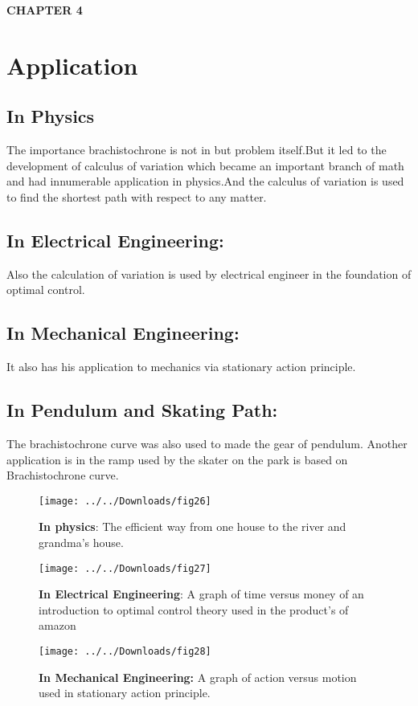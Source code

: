 \documentclass[10pt,a4paper]{article}
\begin{document}
\newpage
\begin{center}
   \textbf{ \textbf{CHAPTER 4}}
    \vspace{1.5 cm}
    \section{Application}
     \vspace{1.5 cm}
    \subsection{In Physics}
    The importance brachistochrone is not in but problem itself.But it led to the
    development of calculus of variation which became an important branch of math and
    had innumerable application in physics.And the calculus of variation is used to find the shortest path with respect to any matter.
    \subsection{In Electrical Engineering:}
    Also the calculation of variation is used by electrical engineer in the foundation of optimal control.
    \subsection{In Mechanical Engineering:}
    It also has his application to mechanics via stationary action principle.
    \subsection{In Pendulum and Skating Path:}
   The brachistochrone curve was also used to made the gear of pendulum. Another
   application is in the ramp used by the skater on the park is based on Brachistochrone curve.
   \newpage
   \begin{figure}
   	\centering
   	\texttt{[image: ../../Downloads/fig26]}
   	\vspace{1 cm}
   	\caption{\textbf{In physics}: The efficient way from one house to the river and grandma’s
   		house.}
   	\label{fig:fig26}
   	\vspace{2.5 cm}
   		\texttt{[image: ../../Downloads/fig27]}
   			\vspace{1 cm}
   	\caption{\textbf{In Electrical Engineering}: A graph of time versus money of an introduction to optimal control theory used in the product’s of amazon}
   \end{figure}
   \newpage
   \begin{figure}
   	\centering
   	\texttt{[image: ../../Downloads/fig28]}
   	\vspace{1 cm}
   	\caption{\textbf{In Mechanical Engineering:} A graph of action versus motion used in stationary action principle.}
   

\end{figure}
\end{center}
\end{document}
